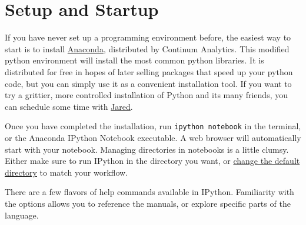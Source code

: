 \documentclass[justified, nobib]{tufte-handout}
\makeatletter
\newcommand{\anacondaLink}{https://store.continuum.io/cshop/anaconda/}
\newcommand{\email}{mailto:jgarst@ucdavis.edu}
\newcommand{\customizeDirectoryLink}
  {http://stackoverflow.com/questions/15680463/change-ipython-working-directory}
\makeatother
\begin{document}
\section*{Setup and Startup}
If you have never set up a programming environment before, the easiest way to
start is to install \href{\anacondaLink}{Anaconda}, distributed by Continum
Analytics. This modified python environment will install the most common python
libraries. It is distributed for free in hopes of later selling packages that
speed up your python code, but you can simply use it as a convenient
installation tool. If you want to try a grittier, more controlled installation
of Python and its many friends, you can schedule some time with
\href{\email}{Jared}.

\smallskip
\noindent
Once you have completed the installation, run \texttt{ipython notebook} in the
terminal, or the Anaconda IPython Notebook executable. A web browser will
automatically start with your notebook. Managing directories in notebooks is a
little clumsy. Either make sure to run IPython in the directory you want, or
\href{\customizeDirectoryLink}{change the default directory} to match your
workflow.

\smallskip
\noindent
There are a few flavors of help commands available in IPython. Familiarity with
the options allows you to reference the manuals, or explore specific parts of
the language.   \\
\end{document}
